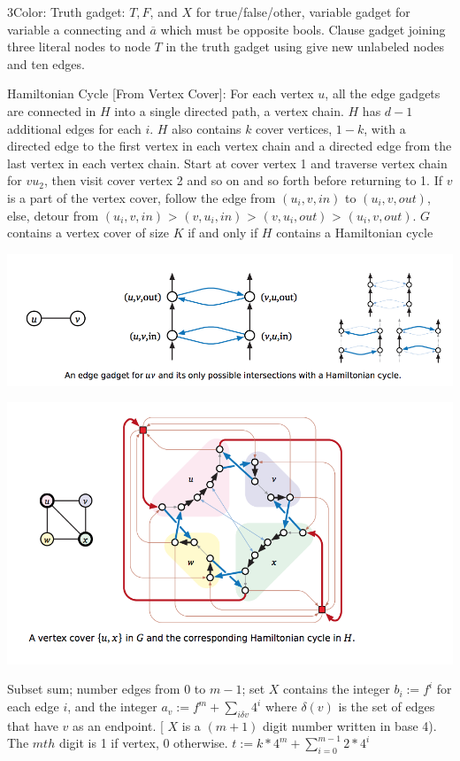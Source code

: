 3Color: Truth gadget: $T,F$, and $X$ for true/false/other, variable gadget for variable a connecting and $\overbar{a}$ which must be opposite bools. Clause gadget joining three literal nodes to node $T$ in the truth gadget using give new unlabeled nodes and ten edges.

Hamiltonian Cycle [From Vertex Cover]: For each vertex $u$, all the edge gadgets are connected in $H$ into a single directed path, a vertex chain. $H$ has $d-1$ additional edges for each $i$. $H$ also contains $k$ cover vertices, $1 - k$, with a directed edge to the first vertex in each vertex chain and a directed edge from the last vertex in each vertex chain.
Start at cover vertex 1 and traverse vertex chain for $vu_{2}$, then visit cover vertex 2 and so on and so forth before returning to 1. If $v$ is a part of the vertex cover, follow the edge from $(u_{i}, v, in)$ to $(u_{i}, v, out)$, else, detour from  $(u_{i}, v, in)$ > $(v, u_{i}, in)$ > $(v, u_{i}, out)$ > $(u_{i}, v, out)$.
$G$ contains a vertex cover of size $K$ if and only if $H$ contains a Hamiltonian cycle

\includegraphics[width=\linewidth]{images/edgegadget.png}


\includegraphics[width=\linewidth]{images/hamiltoniancycle.png}

Subset sum; number edges from 0 to $m-1$; set $X$ contains the integer $b_{i} := f^{i}$ for each edge $i$, and the integer $a_{v} := f^{m} + \sum_{i \delta v}{4^i}$ where $\delta(v)$ is the set of edges that have $v$ as an endpoint. [ $X$ is a $(m+1)$ digit number written in base 4). The $mth$ digit is 1 if vertex, 0 otherwise. $t:= k * 4^m + \sum_{i = 0}^{m-1}{2 * 4^i}$

